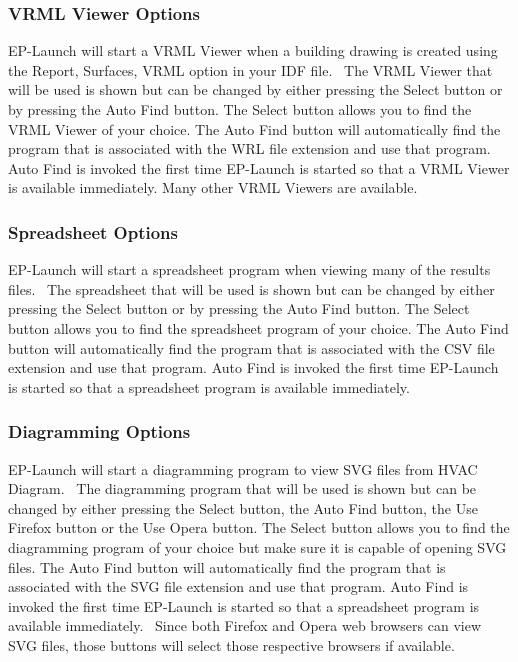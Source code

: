 \subsubsection{VRML Viewer Options}\label{vrml-viewer-options}

EP-Launch will start a VRML Viewer when a building drawing is created using the Report, Surfaces, VRML option in your IDF file.~ The VRML Viewer that will be used is shown but can be changed by either pressing the Select button or by pressing the Auto Find button. The Select button allows you to find the VRML Viewer of your choice. The Auto Find button will automatically find the program that is associated with the WRL file extension and use that program. Auto Find is invoked the first time EP-Launch is started so that a VRML Viewer is available immediately. Many other VRML Viewers are available.

\subsubsection{Spreadsheet Options}\label{spreadsheet-options}

EP-Launch will start a spreadsheet program when viewing many of the results files.~ The spreadsheet that will be used is shown but can be changed by either pressing the Select button or by pressing the Auto Find button. The Select button allows you to find the spreadsheet program of your choice. The Auto Find button will automatically find the program that is associated with the CSV file extension and use that program. Auto Find is invoked the first time EP-Launch is started so that a spreadsheet program is available immediately.

\subsubsection{Diagramming Options}\label{diagramming-options}

EP-Launch will start a diagramming program to view SVG files from HVAC Diagram.~ The diagramming program that will be used is shown but can be changed by either pressing the Select button, the Auto Find button, the Use Firefox button or the Use Opera button. The Select button allows you to find the diagramming program of your choice but make sure it is capable of opening SVG files. The Auto Find button will automatically find the program that is associated with the SVG file extension and use that program. Auto Find is invoked the first time EP-Launch is started so that a spreadsheet program is available immediately.~ Since both Firefox and Opera web browsers can view SVG files, those buttons will select those respective browsers if available.

